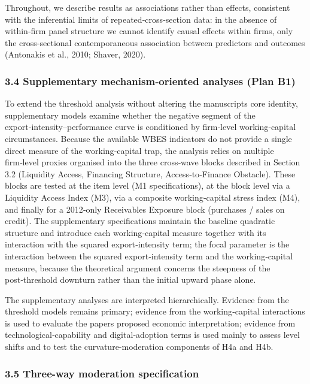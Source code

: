 \documentclass[12pt,a4paper]{article}
\begin{document}
Throughout, we describe results as associations rather than effects,
consistent with the inferential limits of repeated‑cross‑section data:
in the absence of within‑firm panel structure we cannot identify causal
effects within firms, only the cross‑sectional contemporaneous
association between predictors and outcomes (Antonakis et al., 2010;
Shaver, 2020).

\hypertarget{34-supplementary-mechanismoriented-analyses-plan-b1}{%
\subsubsection{3.4 Supplementary mechanism‑oriented analyses (Plan
B1)}\label{34-supplementary-mechanismoriented-analyses-plan-b1}}

To extend the threshold analysis without altering the
manuscript\textquotesingle s core identity, supplementary models examine
whether the negative segment of the export‑intensity--performance curve
is conditioned by firm‑level working‑capital circumstances. Because the
available WBES indicators do not provide a single direct measure of the
working‑capital trap, the analysis relies on multiple firm‑level proxies
organised into the three cross‑wave blocks described in Section 3.2
(Liquidity Access, Financing Structure, Access‑to‑Finance Obstacle).
These blocks are tested at the item level (M1 specifications), at the
block level via a Liquidity Access Index (M3), via a composite
working‑capital stress index (M4), and finally for a 2012‑only
Receivables Exposure block (purchases / sales on credit). The
supplementary specifications maintain the baseline quadratic structure
and introduce each working‑capital measure together with its interaction
with the squared export‑intensity term; the focal parameter is the
interaction between the squared export‑intensity term and the
working‑capital measure, because the theoretical argument concerns the
steepness of the post‑threshold downturn rather than the initial upward
phase alone.

The supplementary analyses are interpreted hierarchically. Evidence from
the threshold models remains primary; evidence from the working‑capital
interactions is used to evaluate the paper\textquotesingle s proposed
economic interpretation; evidence from technological‑capability and
digital‑adoption terms is used mainly to assess level shifts and to test
the curvature-moderation components of H4a and H4b.

\hypertarget{35-three-way-moderation-specification}{%
\subsubsection{3.5 Three-way moderation
specification}\label{35-three-way-moderation-specification}}
\end{document}
